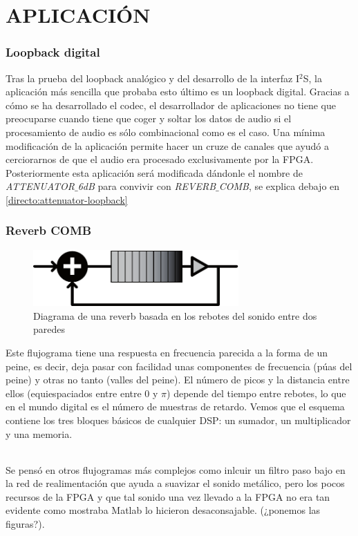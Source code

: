 \part{APLICACIÓN}

\section{Loopback digital}
	Tras la prueba del loopback analógico y del desarrollo de la interfaz I$^2$S, la  aplicación más sencilla que probaba esto último es un loopback digital. Gracias a cómo se ha desarrollado el codec, el desarrollador de aplicaciones no tiene que preocuparse cuando tiene que coger y soltar los datos de audio si el procesamiento de audio es sólo combinacional como es el caso.
	Una mínima modificación de la aplicación permite hacer un cruze de canales que ayudó a cerciorarnos de que el audio era procesado exclusivamente por la FPGA. Posteriormente esta aplicación será modificada dándonle el nombre de \emph{ATTENUATOR$\_$6dB} para convivir con \emph{REVERB$\_$COMB}, se explica debajo en \ref{directo:attenuator-loopback}

\section{Reverb COMB}
\begin{figure}[h]
\begin{center}
	\includegraphics[width=0.7\textwidth]{./reverb_simple_diagram-eps-converted-to}
\caption{Diagrama de una reverb basada en los rebotes del sonido entre dos paredes}
\end{center}
\end{figure}
	Este flujograma tiene una respuesta en frecuencia parecida a la forma de un peine, es decir, deja pasar con facilidad unas componentes de frecuencia (púas del peine) y otras no tanto (valles del peine). El número de picos y la distancia entre ellos (equiespaciados entre entre 0 y $\pi$) depende del tiempo entre rebotes, lo que en el mundo digital es el número de muestras de retardo. Vemos que el esquema contiene los tres bloques básicos de cualquier DSP: un sumador, un multiplicador y una memoria.
	
\paragraph{} Se pensó en otros flujogramas más complejos como inlcuir un filtro paso bajo en la red de realimentación que ayuda a suavizar el sonido metálico, pero los pocos recursos de la FPGA y que tal sonido una vez llevado a la FPGA no era tan evidente como mostraba Matlab lo hicieron desaconsajable. \textcolor{rosa}{(¿ponemos las figuras?)}.
